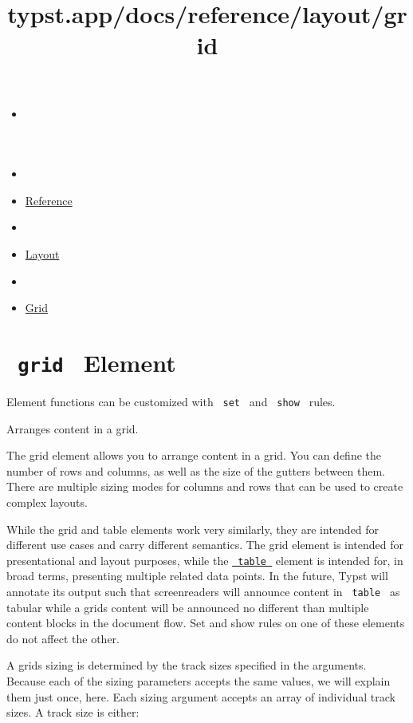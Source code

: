 \title{typst.app/docs/reference/layout/grid}

\begin{itemize}
\tightlist
\item
  \href{/docs}{}
\item
  
\item
  \href{/docs/reference/}{Reference}
\item
  
\item
  \href{/docs/reference/layout/}{Layout}
\item
  
\item
  \href{/docs/reference/layout/grid/}{Grid}
\end{itemize}

\section{\texorpdfstring{\texttt{\ grid\ } {{ Element
}}}{ grid   Element }}\label{summary}

\label{element-tooltip}
Element functions can be customized with \texttt{\ set\ } and
\texttt{\ show\ } rules.

Arranges content in a grid.

The grid element allows you to arrange content in a grid. You can define
the number of rows and columns, as well as the size of the gutters
between them. There are multiple sizing modes for columns and rows that
can be used to create complex layouts.

While the grid and table elements work very similarly, they are intended
for different use cases and carry different semantics. The grid element
is intended for presentational and layout purposes, while the
\href{/docs/reference/model/table/}{\texttt{\ table\ }} element is
intended for, in broad terms, presenting multiple related data points.
In the future, Typst will annotate its output such that screenreaders
will announce content in \texttt{\ table\ } as tabular while a
grid\textquotesingle s content will be announced no different than
multiple content blocks in the document flow. Set and show rules on one
of these elements do not affect the other.

A grid\textquotesingle s sizing is determined by the track sizes
specified in the arguments. Because each of the sizing parameters
accepts the same values, we will explain them just once, here. Each
sizing argument accepts an array of individual track sizes. A track size
is either:

